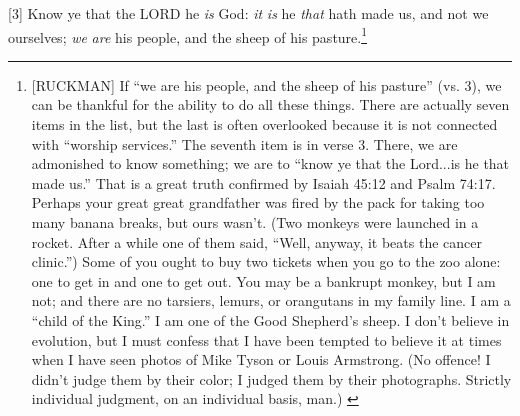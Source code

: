 [3] \textcolor[rgb]{0.00,0.00,1.00}{Know ye that the LORD he \emph{is} God: \emph{it} \emph{is} he \emph{that} hath made us, and not we ourselves; \emph{we} \emph{are} his people, and the sheep of his pasture.}\footnote{[RUCKMAN] If “we are his people, and the sheep of his
pasture” (vs. 3), we can be thankful for the
ability to do all these things. There are
actually seven items in the list, but the last is
often overlooked because it is not connected
with “worship services.” The seventh item is
in verse 3. There, we are admonished to
know something; we are to “know ye that
the Lord...is he that made us.” That is a
great truth confirmed by Isaiah 45:12 and
Psalm 74:17. Perhaps your
great great grandfather was fired by the pack
for taking too many banana breaks, but ours
wasn’t. (Two monkeys were launched in a
rocket. After a while one of them said, “Well,
anyway, it beats the cancer clinic.”)
Some of you ought to buy two tickets when
you go to the zoo alone: one to get in and one
to get out. You may be a bankrupt monkey,
but I am not; and there are no tarsiers,
lemurs, or orangutans in my family line. I am
a “child of the King.” I am one of the Good
Shepherd’s sheep. I don’t believe in
evolution, but I must confess that I have been
tempted to believe it at times when I have
seen photos of Mike Tyson or Louis
Armstrong. (No offence! I didn't judge them
by their color; I judged them by their
photographs. Strictly individual judgment, on
an individual basis, man.) \cite{Ruckman1992Psalms}}
